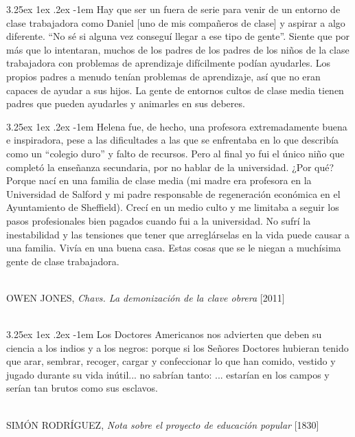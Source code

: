 \documentclass{article}
\makeatletter
\renewcommand{\q}[1]{``#1''}
\renewcommand\paragraph{\@startsection{paragraph}{5}{\z@}%
      {3.25ex \@plus1ex \@minus.2ex}%
      {-1em}%
      {\normalfont\normalsize\bfseries}}
\makeatother
\begin{document}
    \begin{displayquote}
    \paragraph{}
    Hay que ser un fuera de serie para venir de un entorno de clase trabajadora como Daniel [uno de mis compañeros de clase] y aspirar a algo diferente. \q{No sé si alguna vez conseguí llegar a ese tipo de gente}. Siente que por más que lo intentaran, muchos de los padres de los padres de los niños de la clase trabajadora con problemas de aprendizaje difícilmente podían ayudarles. Los propios padres a menudo tenían problemas de aprendizaje, así que no eran capaces de ayudar a sus hijos. La gente de entornos cultos de clase media tienen padres que pueden ayudarles y animarles en sus deberes.
    
    \paragraph{}
    Helena fue, de hecho, una profesora extremadamente buena e inspiradora, pese a las dificultades a las que se enfrentaba en lo que describía como un \q{colegio duro} y falto de recursos. Pero al final yo fui el único niño que completó la enseñanza secundaria, por no hablar de la universidad. ¿Por qué? Porque nací en una familia de clase media (mi madre era profesora en la Universidad de Salford y mi padre responsable de regeneración económica en el Ayuntamiento de Sheffield). Crecí en un medio culto y me limitaba a seguir los pasos profesionales bien pagados cuando fui a la universidad. No sufrí la inestabilidad y las tensiones que tener que arreglárselas en la vida puede causar a una familia. Vivía en una buena casa. Estas cosas que se le niegan a muchísima gente de clase trabajadora.
    \end{displayquote} \\
    \hspace*{\fill}OWEN JONES, \textit{Chavs. La demonización de la clave obrera} [2011]\\ \\
    
    \begin{displayquote}
    \paragraph{}
    Los Doctores Americanos nos advierten que deben su ciencia a los indios y a los negros: porque si los Señores Doctores hubieran tenido que arar, sembrar, recoger, cargar y confeccionar lo que han comido, vestido y jugado durante su vida inútil... no sabrían tanto: ... estarían en los campos y serían tan brutos como sus esclavos.
    \end{displayquote} \\
    \hspace*{\fill} SIMÓN RODRÍGUEZ, \textit{Nota sobre el proyecto de educación popular} [1830]
    \thispagestyle{empty}
    
\end{document}
